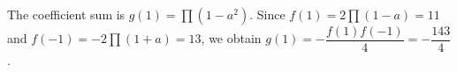 The coefficient sum is $g(1)=\prod(1-a^2)$. Since $f(1)=2\prod(1-a)=11$ and $f(-1)=-2\prod(1+a)=13$, we obtain $g(1)=-\dfrac{f(1)f(-1)}{4}=\boxed{-\dfrac{143}{4}}$.
